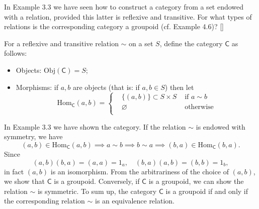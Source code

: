 \begin{problem}[4.2]
	In Example 3.3 we have seen how to construct a category from a set endowed	with a relation, provided this latter is reflexive and transitive. For what types of relations is the corresponding category a groupoid (cf. Example 4.6)? []
\end{problem}
\begin{solution}
	For a reflexive and transitive relation $\sim$ on a set $S$, define the category $\mathsf{C}$ as follows:
	\begin{itemize}
		\item Objects: $\mathrm{Obj}(\mathsf{C})=S$;
		\item Morphisms: if $a, b$ are objects (that is: if $a, b \in S$) then let 
		\[
		\mathrm{Hom}_\mathsf{C}(a, b)=
		\left\{
		\begin{aligned}
		& \big\{ (a, b) \big\} \subset S\times S &\text{ if } a\sim b\\	
		& \varnothing &\text{ otherwise}\\
		\end{aligned}
		\right.
		\]
	\end{itemize}
	In Example 3.3 we have shown the category. If the relation $\sim$ is endowed with symmetry, we have
	\[
	(a,b)\in\mathrm{Hom}_\mathsf{C}(a, b)\implies a\sim b\implies b\sim a\implies (b,a)\in\mathrm{Hom}_\mathsf{C}(b, a).
	\]
	Since
	\[
	(a,b)(b, a)=(a,a)=1_a,\quad(b, a)(a,b)=(b,b)=1_b,
	\]
	in fact $(a,b)$ is an isomorphism. From the arbitrariness of the choice of $(a,b)$, we show that $\mathsf{C}$ is a groupoid. Conversely, if $\mathsf{C}$ is a groupoid, we can show the relation $\sim$ is symmetric. To sum up, the category $\mathsf{C}$ is a groupoid
	if and only if the corresponding relation $\sim$ is an equivalence relation.
\end{solution}


